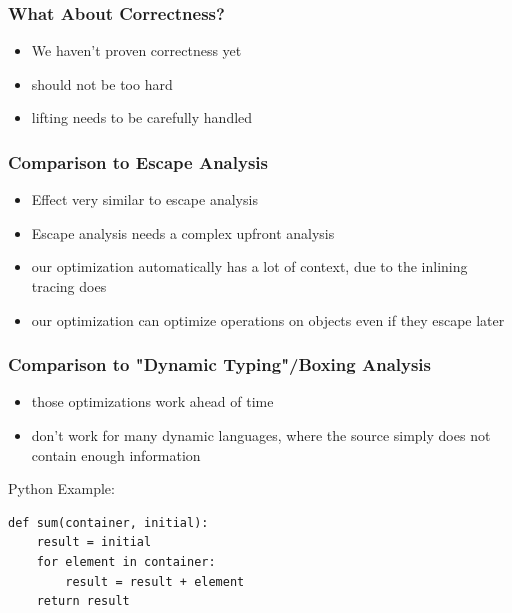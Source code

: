 \documentclass[utf8x]{beamer}
\begin{document}
\begin{frame}
  \frametitle{What About Correctness?}
  \begin{itemize}
      \item We haven't proven correctness yet
      \item should not be too hard
      \item lifting needs to be carefully handled
  \end{itemize}
\end{frame}

\begin{frame}
  \frametitle{Comparison to Escape Analysis}
  \begin{itemize}
      \item Effect very similar to escape analysis
      \item Escape analysis needs a complex upfront analysis
      \item our optimization automatically has a lot of context, due to the inlining tracing does
      \item our optimization can optimize operations on objects even if they escape later
  \end{itemize}
\end{frame}

\begin{frame}[containsverbatim]
  \frametitle{Comparison to "Dynamic Typing"/Boxing Analysis}
  \begin{itemize}
      \item those optimizations work ahead of time
      \item don't work for many dynamic languages, where the source simply does not contain enough information
  \end{itemize}
  \begin{block}{Python Example:}
  \begin{verbatim}
def sum(container, initial):
    result = initial
    for element in container:
        result = result + element
    return result
  \end{verbatim}
  \end{block}
\end{frame}
\end{document}

